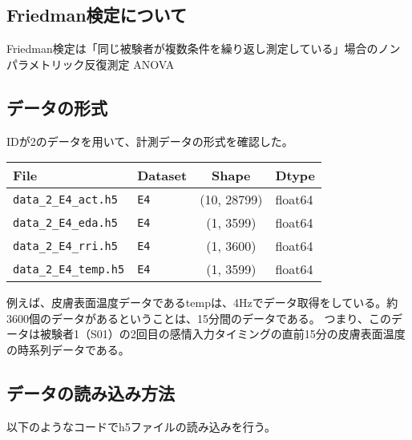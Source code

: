 \documentclass[a4paper,11pt]{article}
\begin{document}
\subsection*{Friedman検定について}
Friedman検定は「同じ被験者が複数条件を繰り返し測定している」場合のノンパラメトリック反復測定 ANOVA


\subsection*{データの形式}
IDが2のデータを用いて、計測データの形式を確認した。
\begin{table}[ht]
  \centering
  \begin{tabular}{|l|l|c|l|}
    \hline
    \textbf{File} & \textbf{Dataset} & \textbf{Shape} & \textbf{Dtype} \\ \hline
    \texttt{data\_2\_E4\_act.h5} & \texttt{E4} & (10, 28799) & float64 \\ \hline
    \texttt{data\_2\_E4\_eda.h5} & \texttt{E4} & (1, 3599)   & float64 \\ \hline
    \texttt{data\_2\_E4\_rri.h5} & \texttt{E4} & (1, 3600)   & float64 \\ \hline
    \texttt{data\_2\_E4\_temp.h5} & \texttt{E4} & (1, 3599)   & float64 \\ \hline
  \end{tabular}
\end{table}

例えば、皮膚表面温度データであるtempは、4Hzでデータ取得をしている。約3600個のデータがあるということは、15分間のデータである。
つまり、このデータは被験者1（S01）の2回目の感情入力タイミングの直前15分の皮膚表面温度の時系列データである。



\newpage
\subsection*{データの読み込み方法}
以下のようなコードでh5ファイルの読み込みを行う。
\end{document}
